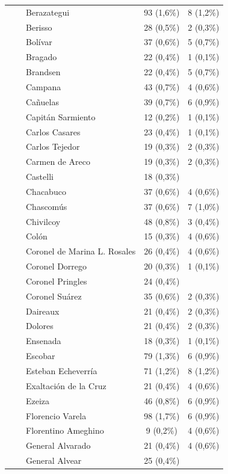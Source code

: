 \documentclass[
  spanish,
  a4paper,
]{scrreprt}
\begin{document}
\begin{table}
{\begin{tabular*}{\linewidth}{@{\extracolsep{\fill}}lcc}
    Berazategui & 93 (1,6\%) & 8 (1,2\%) \\ 
    Berisso & 28 (0,5\%) & 2 (0,3\%) \\ 
    Bolívar & 37 (0,6\%) & 5 (0,7\%) \\ 
    Bragado & 22 (0,4\%) & 1 (0,1\%) \\ 
    Brandsen & 22 (0,4\%) & 5 (0,7\%) \\ 
    Campana & 43 (0,7\%) & 4 (0,6\%) \\ 
    Cañuelas & 39 (0,7\%) & 6 (0,9\%) \\ 
    Capitán Sarmiento & 12 (0,2\%) & 1 (0,1\%) \\ 
    Carlos Casares & 23 (0,4\%) & 1 (0,1\%) \\ 
    Carlos Tejedor & 19 (0,3\%) & 2 (0,3\%) \\ 
    Carmen de Areco & 19 (0,3\%) & 2 (0,3\%) \\ 
    Castelli & 18 (0,3\%) &  \\ 
    Chacabuco & 37 (0,6\%) & 4 (0,6\%) \\ 
    Chascomús & 37 (0,6\%) & 7 (1,0\%) \\ 
    Chivilcoy & 48 (0,8\%) & 3 (0,4\%) \\ 
    Colón & 15 (0,3\%) & 4 (0,6\%) \\ 
    Coronel de Marina L. Rosales & 26 (0,4\%) & 4 (0,6\%) \\ 
    Coronel Dorrego & 20 (0,3\%) & 1 (0,1\%) \\ 
    Coronel Pringles & 24 (0,4\%) &  \\ 
    Coronel Suárez & 35 (0,6\%) & 2 (0,3\%) \\ 
    Daireaux & 21 (0,4\%) & 2 (0,3\%) \\ 
    Dolores & 21 (0,4\%) & 2 (0,3\%) \\ 
    Ensenada & 18 (0,3\%) & 1 (0,1\%) \\ 
    Escobar & 79 (1,3\%) & 6 (0,9\%) \\ 
    Esteban Echeverría & 71 (1,2\%) & 8 (1,2\%) \\ 
    Exaltación de la Cruz & 21 (0,4\%) & 4 (0,6\%) \\ 
    Ezeiza & 46 (0,8\%) & 6 (0,9\%) \\ 
    Florencio Varela & 98 (1,7\%) & 6 (0,9\%) \\ 
    Florentino Ameghino & 9 (0,2\%) & 4 (0,6\%) \\ 
    General Alvarado & 21 (0,4\%) & 4 (0,6\%) \\ 
    General Alvear & 25 (0,4\%) &  \\ 

\end{tabular*}}
\end{table}
\end{document}
